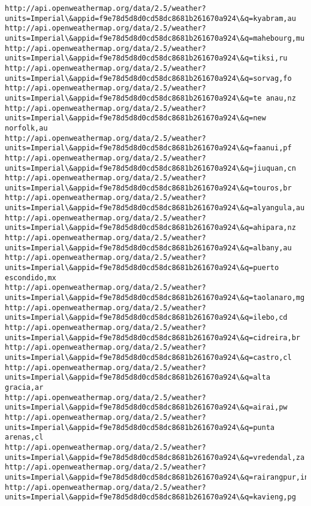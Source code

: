 \documentclass[11pt]{article}
\begin{document}
\begin{Verbatim}[commandchars=\\\{\}]
http://api.openweathermap.org/data/2.5/weather?units=Imperial\&appid=f9e78d5d8d0cd58dc8681b261670a924\&q=kyabram,au
http://api.openweathermap.org/data/2.5/weather?units=Imperial\&appid=f9e78d5d8d0cd58dc8681b261670a924\&q=mahebourg,mu
http://api.openweathermap.org/data/2.5/weather?units=Imperial\&appid=f9e78d5d8d0cd58dc8681b261670a924\&q=tiksi,ru
http://api.openweathermap.org/data/2.5/weather?units=Imperial\&appid=f9e78d5d8d0cd58dc8681b261670a924\&q=sorvag,fo
http://api.openweathermap.org/data/2.5/weather?units=Imperial\&appid=f9e78d5d8d0cd58dc8681b261670a924\&q=te anau,nz
http://api.openweathermap.org/data/2.5/weather?units=Imperial\&appid=f9e78d5d8d0cd58dc8681b261670a924\&q=new norfolk,au
http://api.openweathermap.org/data/2.5/weather?units=Imperial\&appid=f9e78d5d8d0cd58dc8681b261670a924\&q=faanui,pf
http://api.openweathermap.org/data/2.5/weather?units=Imperial\&appid=f9e78d5d8d0cd58dc8681b261670a924\&q=jiuquan,cn
http://api.openweathermap.org/data/2.5/weather?units=Imperial\&appid=f9e78d5d8d0cd58dc8681b261670a924\&q=touros,br
http://api.openweathermap.org/data/2.5/weather?units=Imperial\&appid=f9e78d5d8d0cd58dc8681b261670a924\&q=alyangula,au
http://api.openweathermap.org/data/2.5/weather?units=Imperial\&appid=f9e78d5d8d0cd58dc8681b261670a924\&q=ahipara,nz
http://api.openweathermap.org/data/2.5/weather?units=Imperial\&appid=f9e78d5d8d0cd58dc8681b261670a924\&q=albany,au
http://api.openweathermap.org/data/2.5/weather?units=Imperial\&appid=f9e78d5d8d0cd58dc8681b261670a924\&q=puerto escondido,mx
http://api.openweathermap.org/data/2.5/weather?units=Imperial\&appid=f9e78d5d8d0cd58dc8681b261670a924\&q=taolanaro,mg
http://api.openweathermap.org/data/2.5/weather?units=Imperial\&appid=f9e78d5d8d0cd58dc8681b261670a924\&q=ilebo,cd
http://api.openweathermap.org/data/2.5/weather?units=Imperial\&appid=f9e78d5d8d0cd58dc8681b261670a924\&q=cidreira,br
http://api.openweathermap.org/data/2.5/weather?units=Imperial\&appid=f9e78d5d8d0cd58dc8681b261670a924\&q=castro,cl
http://api.openweathermap.org/data/2.5/weather?units=Imperial\&appid=f9e78d5d8d0cd58dc8681b261670a924\&q=alta gracia,ar
http://api.openweathermap.org/data/2.5/weather?units=Imperial\&appid=f9e78d5d8d0cd58dc8681b261670a924\&q=airai,pw
http://api.openweathermap.org/data/2.5/weather?units=Imperial\&appid=f9e78d5d8d0cd58dc8681b261670a924\&q=punta arenas,cl
http://api.openweathermap.org/data/2.5/weather?units=Imperial\&appid=f9e78d5d8d0cd58dc8681b261670a924\&q=vredendal,za
http://api.openweathermap.org/data/2.5/weather?units=Imperial\&appid=f9e78d5d8d0cd58dc8681b261670a924\&q=rairangpur,in
http://api.openweathermap.org/data/2.5/weather?units=Imperial\&appid=f9e78d5d8d0cd58dc8681b261670a924\&q=kavieng,pg

\end{Verbatim}
\end{document}
